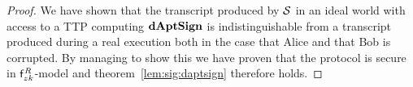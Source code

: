 \begin{proof}
    We have shown that the transcript produced by $\mathcal{S}$ in an ideal world with access to a TTP computing $\mathbf{dAptSign}$ is indistinguishable from a transcript produced during a real execution both in the case that Alice and that Bob is corrupted.
    By managing to show this we have proven that the protocol is secure in $\mathsf{f}^{\mathit{R}}_{zk}$-model and theorem~\cref{lem:sig:daptsign} therefore holds.
\end{proof}